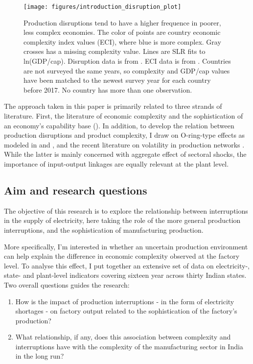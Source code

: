 \documentclass[11pt]{article}
\begin{document}
\begin{figure}[htpb]
	\centering
	\texttt{[image: figures/introduction\_disruption\_plot]}
	\caption[Production disruption, economic complexity and GDP per capita]{Production disruptions tend to have a higher frequence in poorer, less complex economies. The color of points are country economic complexity index values (ECI), where blue is more complex. Gray crosses has a missing complexity value. Lines are SLR fits to ln(GDP/cap). Disruption data is from \cite{world_bank_enterprise_2020}. ECI data is from \cite{simoes_economic_2011}. Countries are not surveyed the same years, so complexity and GDP/cap values have been matched to the newest survey year for each country before 2017. No country has more than one observation.}
	\label{fig:disruption-fig}
\end{figure}

The approach taken in this paper is primarily related to three strands of literature. First, the literature of economic complexity and the sophistication of an economy's capability base  (\citealp{frenken_related_2007,hausmann_atlas_2013,tacchella_new_2012}). In addition, to develop the relation between production disruptions and product complexity, I draw on O-ring-type effects as modeled in \cite{kremer_o-ring_1993} and \cite{jones_intermediate_2011}, and the recent literature on volatility in production networks \citep{acemoglu_network_2012}. While the latter is mainly concerned with aggregate effect of sectoral shocks, the importance of input-output linkages are equally relevant at the plant level.

\subsection{Aim and research questions}%
\label{sub:aim_and_research_questions}
The objective of this research is to explore the relationship between interruptions in the supply of electricity, here taking the role of the more general production interruptions, and the sophistication of manufacturing production.

More specifically, I'm interested in whether an uncertain production environment can help explain the difference in economic complexity observed at the factory level. To analyse this effect, I put together an extensive set of data on electricity-, state- and plant-level indicators covering sixteen year across thirty Indian states. Two overall questions guides the research: 

\begin{enumerate}

\item How is the impact of production interruptions - in the form of electricity shortages - on factory output related to the sophistication of the factory's production?

\item What relationship, if any, does this association between complexity and interruptions have with the complexity of the manufacturing sector in India in the long run?

\end{enumerate}
\end{document}
